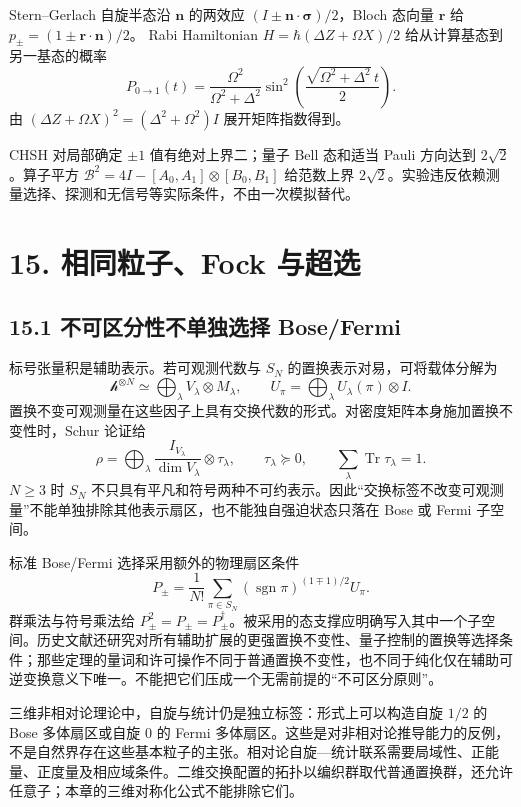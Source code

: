 \documentclass[
  11pt,
  oneside]{book}
\begin{document}
Stern--Gerlach 自旋半态沿 \(\mathbf n\) 的两效应
\((I\pm\mathbf n\cdot\boldsymbol\sigma)/2\)，Bloch 态向量 \(\mathbf r\)
给 \(p_\pm=(1\pm\mathbf r\cdot\mathbf n)/2\)。 Rabi Hamiltonian
\(H=\hbar(\Delta Z+\Omega X)/2\) 给从计算基态到另一基态的概率 \[
P_{0\to1}(t)=\frac{\Omega^2}{\Omega^2+\Delta^2}
\sin^2\left(\frac{\sqrt{\Omega^2+\Delta^2}\,t}{2}\right).
\] 由 \((\Delta Z+\Omega X)^2=(\Delta^2+\Omega^2)I\) 展开矩阵指数得到。

CHSH 对局部确定 \(\pm1\) 值有绝对上界二；量子 Bell 态和适当 Pauli
方向达到 \(2\sqrt2\)。算子平方
\(\mathcal B^2=4I-[A_0,A_1]\otimes[B_0,B_1]\) 给范数上界
\(2\sqrt2\)。实验违反依赖测量选择、探测和无信号等实际条件，不由一次模拟替代。

\hypertarget{ch-15}{%
\chapter{15. 相同粒子、Fock 与超选}\label{ch-15}}

\hypertarget{ux4e0dux53efux533aux5206ux6027ux4e0dux5355ux72ecux9009ux62e9-bosefermi}{%
\section{15.1 不可区分性不单独选择
Bose/Fermi}\label{ux4e0dux53efux533aux5206ux6027ux4e0dux5355ux72ecux9009ux62e9-bosefermi}}

标号张量积是辅助表示。若可观测代数与 \(S_N\)
的置换表示对易，可将载体分解为 \[
\mathcal h^{\otimes N}\simeq\bigoplus_\lambda V_\lambda\otimes M_\lambda,
\qquad U_\pi=\bigoplus_\lambda U_\lambda(\pi)\otimes I.
\]
置换不变可观测量在这些因子上具有交换代数的形式。对密度矩阵本身施加置换不变性时，Schur
论证给 \[
\rho=\bigoplus_\lambda\frac{I_{V_\lambda}}{\dim V_\lambda}\otimes\tau_\lambda,
\qquad \tau_\lambda\succeq0,\qquad\sum_\lambda\operatorname{Tr}\tau_\lambda=1.
\] \(N\ge3\) 时 \(S_N\)
不只具有平凡和符号两种不可约表示。因此``交换标签不改变可观测量''不能单独排除其他表示扇区，也不能独自强迫状态只落在
Bose 或 Fermi 子空间。

标准 Bose/Fermi 选择采用额外的物理扇区条件 \[
P_\pm=\frac1{N!}\sum_{\pi\in S_N}
(\operatorname{sgn}\pi)^{(1\mp1)/2}U_\pi.
\] 群乘法与符号乘法给
\(P_\pm^2=P_\pm=P_\pm^\dagger\)。被采用的态支撑应明确写入其中一个子空间。历史文献还研究对所有辅助扩展的更强置换不变性、量子控制的置换等选择条件；那些定理的量词和许可操作不同于普通置换不变性，也不同于纯化仅在辅助可逆变换意义下唯一。不能把它们压成一个无需前提的``不可区分原则''。

三维非相对论理论中，自旋与统计仍是独立标签：形式上可以构造自旋 \(1/2\)
的 Bose 多体扇区或自旋 \(0\) 的 Fermi
多体扇区。这些是对非相对论推导能力的反例，不是自然界存在这些基本粒子的主张。相对论自旋---统计联系需要局域性、正能量、正度量及相应域条件。二维交换配置的拓扑以编织群取代普通置换群，还允许任意子；本章的三维对称化公式不能排除它们。
\end{document}
